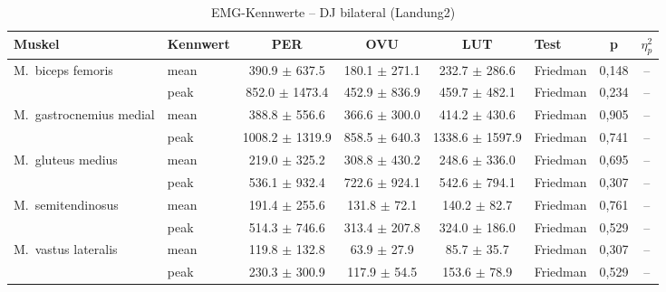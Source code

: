 \begin{table}[H]
  \centering
  \caption{EMG-Kennwerte – DJ bilateral (Landung2)}
  \label{tab:DJ_bilateral_Landung2}
  \small
  \begin{tabular}{l l c c c l c c}
    \hline
    \textbf{Muskel} & \textbf{Kennwert} & \textbf{PER} & \textbf{OVU} & \textbf{LUT} & \textbf{Test} & \textbf{p} & \textbf{$\eta^2_p$} \\
    \hline
    M.~biceps femoris & mean & 390.9 $\pm$ 637.5 & 180.1 $\pm$ 271.1 & 232.7 $\pm$ 286.6 & Friedman & 0{,}148 & -- \\
     & peak & 852.0 $\pm$ 1473.4 & 452.9 $\pm$ 836.9 & 459.7 $\pm$ 482.1 & Friedman & 0{,}234 & -- \\
    \hline
    M.~gastrocnemius medial & mean & 388.8 $\pm$ 556.6 & 366.6 $\pm$ 300.0 & 414.2 $\pm$ 430.6 & Friedman & 0{,}905 & -- \\
     & peak & 1008.2 $\pm$ 1319.9 & 858.5 $\pm$ 640.3 & 1338.6 $\pm$ 1597.9 & Friedman & 0{,}741 & -- \\
    \hline
    M.~gluteus medius & mean & 219.0 $\pm$ 325.2 & 308.8 $\pm$ 430.2 & 248.6 $\pm$ 336.0 & Friedman & 0{,}695 & -- \\
     & peak & 536.1 $\pm$ 932.4 & 722.6 $\pm$ 924.1 & 542.6 $\pm$ 794.1 & Friedman & 0{,}307 & -- \\
    \hline
    M.~semitendinosus & mean & 191.4 $\pm$ 255.6 & 131.8 $\pm$ 72.1 & 140.2 $\pm$ 82.7 & Friedman & 0{,}761 & -- \\
     & peak & 514.3 $\pm$ 746.6 & 313.4 $\pm$ 207.8 & 324.0 $\pm$ 186.0 & Friedman & 0{,}529 & -- \\
    \hline
    M.~vastus lateralis & mean & 119.8 $\pm$ 132.8 & 63.9 $\pm$ 27.9 & 85.7 $\pm$ 35.7 & Friedman & 0{,}307 & -- \\
     & peak & 230.3 $\pm$ 300.9 & 117.9 $\pm$ 54.5 & 153.6 $\pm$ 78.9 & Friedman & 0{,}529 & -- \\
    \hline
  \end{tabular}
\end{table}

